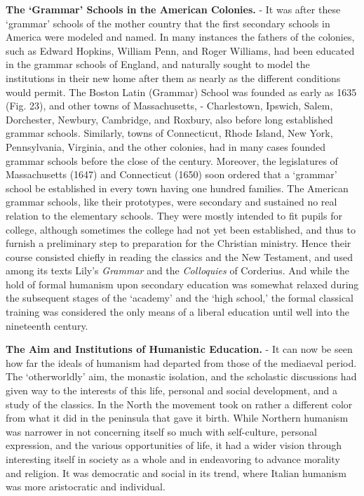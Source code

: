 \documentclass[
]{book}
\begin{document}
\textbf{The `Grammar' Schools in the American Colonies.} - It was after these `grammar' schools of the mother country that the first secondary schools in America were modeled and named. In many instances the fathers of the colonies, such as Edward Hopkins, William Penn, and Roger Williams, had been educated in the grammar schools of England, and naturally sought to model the institutions in their new home after them as nearly as the different conditions would permit. The Boston Latin (Grammar) School was founded as early as 1635 (Fig. 23), and other towns of Massachusetts, - Charlestown, Ipswich, Salem, Dorchester, Newbury, Cambridge, and Roxbury, also before long established grammar schools. Similarly, towns of Connecticut, Rhode Island, New York, Pennsylvania, Virginia, and the other colonies, had in many cases founded grammar schools before the close of the century. Moreover, the legislatures of Massachusetts (1647) and Connecticut (1650) soon ordered that a `grammar' school be established in every town having one hundred families. The American grammar schools, like their prototypes, were secondary and sustained no real relation to the elementary schools. They were mostly intended to fit pupils for college, although sometimes the college had not yet been established, and thus to furnish a preliminary step to preparation for the Christian ministry. Hence their course consisted chiefly in reading the classics and the New Testament, and used among its texts Lily's \emph{Grammar} and the \emph{Colloquies} of Corderius. And while the hold of formal humanism upon secondary education was somewhat relaxed during the subsequent stages of the `academy' and the `high school,' the formal classical training was considered the only means of a liberal education until well into the nineteenth century.

\textbf{The Aim and Institutions of Humanistic Education.} - It can now be seen how far the ideals of humanism had departed from those of the mediaeval period. The `otherworldly' aim, the monastic isolation, and the scholastic discussions had given way to the interests of this life, personal and social development, and a study of the classics. In the North the movement took on rather a different color from what it did in the peninsula that gave it birth. While Northern humanism was narrower in not concerning itself so much with self-culture, personal expression, and the various opportunities of life, it had a wider vision through interesting itself in society as a whole and in endeavoring to advance morality and religion. It was democratic and social in its trend, where Italian humanism was more aristocratic and individual.
\end{document}
